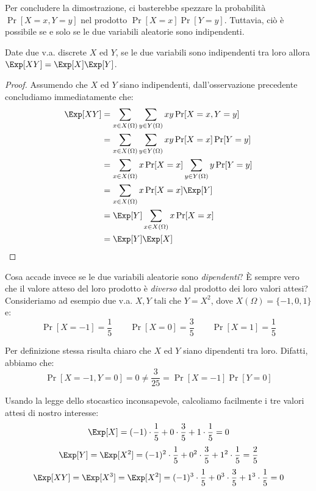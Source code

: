 \documentclass[a4paper, 12pt]{report}
\begin{document}
    Per concludere la dimostrazione, ci basterebbe spezzare la probabilità $\Pr[X = x, Y = y]$ nel prodotto $\Pr[X = x] \Pr[Y = y]$. Tuttavia, ciò è possibile se e solo se le due variabili aleatorie sono indipendenti.
    \label{ind_exp_val}

    \begin{framedthm}{}
        Date due v.a. discrete $X$ ed $Y$, se le due variabili sono indipendenti tra loro allora $\Exp[XY] = \Exp[X]\Exp[Y]$.
    \end{framedthm}

    \begin{proof}
        Assumendo che $X$ ed $Y$ siano indipendenti, dall'osservazione precedente concludiamo immediatamente che:
        \[\begin{split}
            \Exp[XY] &=  \sum_{x \in X(\Omega)} \sum_{y \in Y(\Omega)} xy \Pr[X = x, Y = y] \\
            &= \sum_{x \in X(\Omega)} \sum_{y \in Y(\Omega)} xy \Pr[X = x]\Pr[Y = y] \\
            &= \sum_{x \in X(\Omega)} x \Pr[X = x] \sum_{y \in Y(\Omega)} y\Pr[Y = y] \\
            &= \sum_{x \in X(\Omega)} x \Pr[X = x] \Exp[Y] \\
            &= \Exp[Y] \sum_{x \in X(\Omega)} x \Pr[X = x] \\
            &= \Exp[Y] \Exp[X] \\
        \end{split}\]
    \end{proof}

    Cosa accade invece se le due variabili aleatorie sono \textit{dipendenti}? È sempre vero che il valore atteso del loro prodotto è \textit{diverso} dal prodotto dei loro valori attesi? Consideriamo ad esempio due v.a. $X, Y$ tali che $Y = X^2$, dove $X(\Omega) = \{-1,0,1\}$ e:
    \[\Pr[X = -1] = \frac{1}{5} \qquad \Pr[X = 0] = \frac{3}{5} \qquad \Pr[X = 1] = \frac{1}{5}\]

    Per definizione stessa risulta chiaro che $X$ ed $Y$ siano dipendenti tra loro. Difatti, abbiamo che:
    \[\Pr[X = -1, Y = 0] = 0 \neq \frac{3}{25} = \Pr[X = -1] \Pr[Y = 0]\]

    Usando la legge dello stocastico inconsapevole, calcoliamo facilmente i tre valori attesi di nostro interesse:
    \[\Exp[X] = (-1) \cdot \frac{1}{5} + 0 \cdot \frac{3}{5} + 1 \cdot \frac{1}{5} = 0\]
    \[\Exp[Y] = \Exp[X^2] = (-1)^2 \cdot \frac{1}{5} + 0^2 \cdot \frac{3}{5} + 1^2 \cdot \frac{1}{5} = \frac{2}{5}\]
    \[\Exp[XY] = \Exp[X^3] = \Exp[X^2] = (-1)^3 \cdot \frac{1}{5} + 0^3 \cdot \frac{3}{5} + 1^3 \cdot \frac{1}{5} = 0\]
\end{document}
